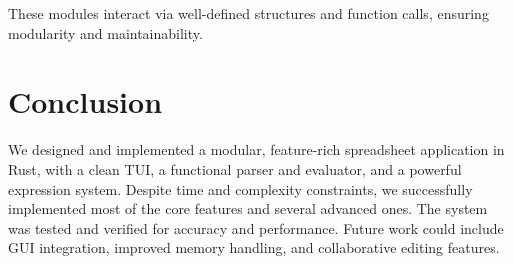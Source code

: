 \documentclass{article}
\begin{document}
These modules interact via well-defined structures and function calls, ensuring modularity and maintainability.














\section{Conclusion}
We designed and implemented a modular, feature-rich spreadsheet application in Rust, with a clean TUI, a functional parser and evaluator, and a powerful expression system. Despite time and complexity constraints, we successfully implemented most of the core features and several advanced ones. The system was tested and verified for accuracy and performance. Future work could include GUI integration, improved memory handling, and collaborative editing features.
\end{document}
